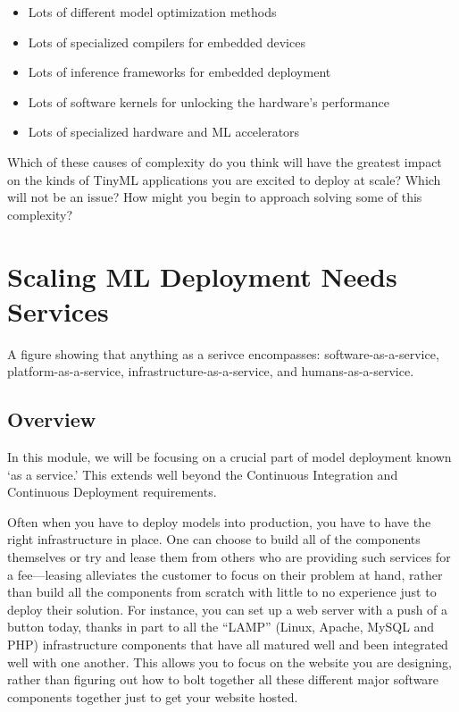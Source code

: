 {{{{{ \begin{itemize}
  \item Lots of different model optimization methods
  \item Lots of specialized compilers for embedded devices
  \item Lots of inference frameworks for embedded deployment
  \item Lots of software kernels for unlocking the hardware’s performance
  \item Lots of specialized hardware and ML accelerators
 \end{itemize}


 Which of these causes of complexity do you think will have the greatest impact on the kinds of TinyML applications you are excited to deploy at scale? Which will not be an issue? How might you begin to approach solving some of this complexity?
 
\section{Scaling ML Deployment Needs Services}



A figure showing that anything as a serivce encompasses: software-as-a-service, platform-as-a-service, infrastructure-as-a-service, and humans-as-a-service.

\subsection{Overview}

In this module, we will be focusing on a crucial part of model deployment known ‘as a service.’ This extends well beyond the Continuous Integration and Continuous Deployment requirements.

Often when you have to deploy models into production, you have to have the right infrastructure in place. One can choose to build all of the components themselves or try and lease them from others who are providing such services for a fee—leasing alleviates the customer to focus on their problem at hand, rather than build all the components from scratch with little to no experience just to deploy their solution. For instance, you can set up a web server with a push of a button today, thanks in part to all the “LAMP” (Linux, Apache, MySQL and PHP) infrastructure components that have all matured well and been integrated well with one another. This allows you to focus on the website you are designing, rather than figuring out how to bolt together all these different major software components together just to get your website hosted.

}}}}}
